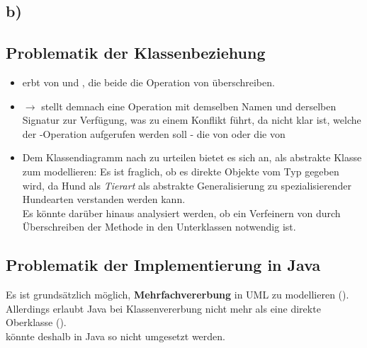 \subsection*{b)}

\subsection*{Problematik der Klassenbeziehung}
\begin{itemize}
    \item {} erbt von  und , die beide die Operation  von  überschreiben.
    \item[] $\rightarrow$  stellt demnach eine Operation mit demselben Namen und derselben Signatur zur Verfügung, was zu einem Konflikt führt, da nicht klar ist, welche der -Operation aufgerufen werden soll - die von  oder die von 
    \item Dem Klassendiagramm nach zu urteilen bietet es sich an,  als abstrakte Klasse zum modellieren: Es ist fraglich, ob es direkte Objekte vom Typ  gegeben wird, da Hund als \textit{Tierart} als abstrakte Generalisierung zu spezialisierender Hundearten verstanden werden kann.\\
    Es könnte darüber hinaus analysiert werden, ob ein Verfeinern von  durch Überschreiben der Methode  in den Unterklassen notwendig ist.
\end{itemize}

\subsection{Problematik der Implementierung in Java}
Es ist grundsätzlich möglich, \textbf{Mehrfachvererbung} in UML zu modellieren (\cite[300]{Bal05}).\\
Allerdings erlaubt Java bei Klassenvererbung nicht mehr als eine direkte Oberklasse (\cite[526]{Ull23}).\\
 könnte deshalb in Java so nicht umgesetzt werden.
